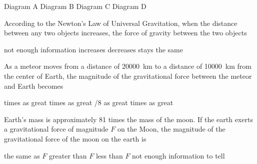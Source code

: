 \documentclass[answers]{exam}
\begin{document}
\begin{questions}
{\color{white} \tiny
\begin{randomizeoneparchoices}[norandomize]
    \correctchoice Diagram A \hspace{1cm}
    \choice Diagram B \hspace{1cm}
    \choice Diagram C \hspace{1cm}
    \choice Diagram D \hspace{1cm}
\end{randomizeoneparchoices}
}

\question
According to the Newton’s Law of Universal Gravitation, when the distance between any two objects increases, the force of gravity between the two objects

\begin{randomizechoices}[norandomize]
    \choice not enough information
    \choice increases
    \correctchoice decreases
    \choice stays the same    
\end{randomizechoices}


\question %

As a meteor moves from a distance of \SI[group-separator={,}]{20000}{km} to a distance of \SI[group-separator={,}]{10000}{km} from the center of Earth, the magnitude of the gravitational force between the meteor and Earth becomes

\begin{randomizeoneparchoices}[norandomize]
     times as great
     times as great
    /8 as great
     times as great
\end{randomizeoneparchoices}

\question
Earth’s mass is approximately 81 times the mass of the moon.  If the earth exerts a gravitational force of magnitude $F$ on the Moon, the magnitude of the gravitational force of the moon on the earth is

\begin{randomizechoices}[norandomize]
    \correctchoice the same as $F$
    \choice greater than $F$
    \choice less than $F$
    \choice not enough information to tell
\end{randomizechoices}


\end{questions}
\end{document}
